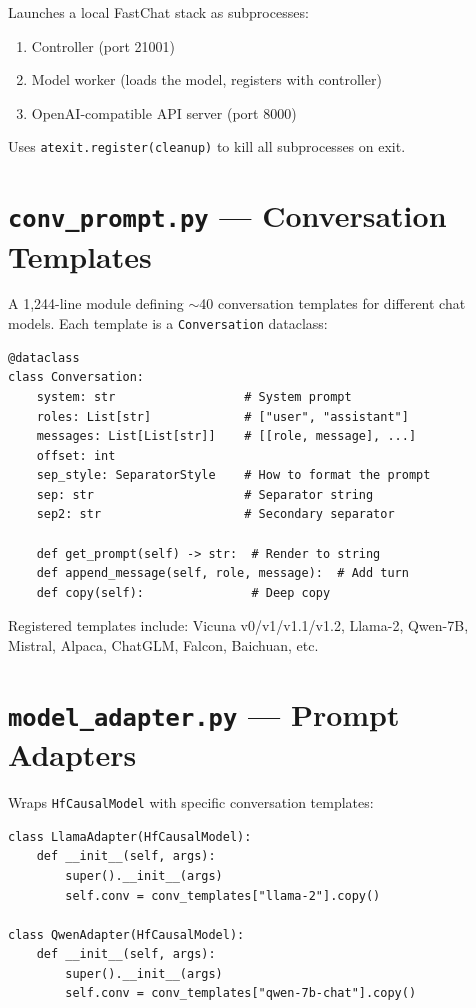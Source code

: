 \documentclass[11pt,a4paper,oneside,openany]{book}
\theoremstyle{definition}
\newcommand{\code}[1]{\texttt{#1}}
\begin{document}
Launches a local FastChat stack as subprocesses:
\begin{enumerate}
	\item Controller (port 21001)
	\item Model worker (loads the model, registers with controller)
	\item OpenAI-compatible API server (port 8000)
\end{enumerate}

Uses \code{atexit.register(cleanup)} to kill all subprocesses on exit.

\section{\texttt{conv\_prompt.py} --- Conversation Templates}

A 1,244-line module defining $\sim$40 conversation templates for different chat models. Each template is a \code{Conversation} dataclass:

\begin{lstlisting}
@dataclass
class Conversation:
    system: str                  # System prompt
    roles: List[str]             # ["user", "assistant"]
    messages: List[List[str]]    # [[role, message], ...]
    offset: int
    sep_style: SeparatorStyle    # How to format the prompt
    sep: str                     # Separator string
    sep2: str                    # Secondary separator

    def get_prompt(self) -> str:  # Render to string
    def append_message(self, role, message):  # Add turn
    def copy(self):               # Deep copy
\end{lstlisting}

Registered templates include: Vicuna v0/v1/v1.1/v1.2, Llama-2, Qwen-7B, Mistral, Alpaca, ChatGLM, Falcon, Baichuan, etc.

\section{\texttt{model\_adapter.py} --- Prompt Adapters}

Wraps \code{HfCausalModel} with specific conversation templates:

\begin{lstlisting}
class LlamaAdapter(HfCausalModel):
    def __init__(self, args):
        super().__init__(args)
        self.conv = conv_templates["llama-2"].copy()

class QwenAdapter(HfCausalModel):
    def __init__(self, args):
        super().__init__(args)
        self.conv = conv_templates["qwen-7b-chat"].copy()
\end{lstlisting}
\end{document}
